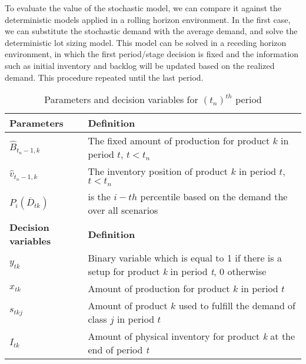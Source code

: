 \documentclass[10pt]{article}
\newcommand{\ti}{t} %
\newcommand{\ka}{k} %
\newcommand{\jey}{j} %
\begin{document}
To evaluate the value of the  stochastic  model, we can compare it against the deterministic models applied in a rolling horizon environment.
In the first case, we can substitute the stochastic demand with the average demand, and solve the deterministic lot sizing model. This model can be solved in a receding horizon environment, in which the first period/stage decision is fixed and the information such as initial inventory and backlog will be updated based on the realized demand. 
This procedure repeated until the last period. 
\begin{table}[H]
\centering
\caption{Parameters and decision variables for $(t_n)^{th}$ period}
\begin{adjustbox}{width=1\textwidth,center=\textwidth}
\begin{tabular}{ll}
\toprule
{\bf Parameters} & {\bf Definition} \\ \midrule
$\hat{B}_{\ti_n-1, \ka}$  & The fixed amount of production for product $k$ in period $t$, $t<t_n$\\
$\hat{v}_{\ti_n-1, \ka}$  & The inventory position of product $k$ in period $t$, $t<t_n$ \\
$P_{i}(\overline{D}_{\ti \ka})$& is the $i-th$ percentile based on the demand the over all scenarios\\
{\bf Decision variables} & {\bf Definition} \\ \midrule
$y_{\ti \ka}$ & Binary variable which is equal to 1 if there is a setup for product {\it k} in period {\it t}, 0 otherwise \\ 
$x_{\ti \ka}$ & Amount of production for product $k$ in period $t$ \\ 
$s_{\ti \ka \jey}$ & Amount of product $k$ used to fulfill the demand of class $j$  in period $t$   \\
${I}_{\ti \ka}$ & Amount of physical inventory for product {\it k} at the end of period {\it t}  \\ \bottomrule
\end{tabular}
\end{adjustbox}
 \label{tab:Sub_FD_parameters}
\end{table}
\end{document}

